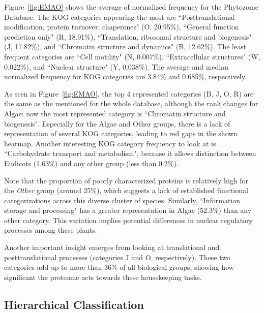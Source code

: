 Figure~\ref{fig:EMAO} shows the average of normalized frequency 
for the Phytozome Database. The KOG categories 
appearing the most are ``Posttranslational modification, 
protein turnover, chaperones" (O, 20.95\%), ``General function 
prediction only" (R, 18.91\%), ``Translation, ribosomal 
structure and biogenesis" (J, 17.82\%), and ``Chromatin 
structure and dynamics" (B, 12.62\%). The least frequent 
categories are ``Cell motility" (N, 0.007\%), ``Extracellular 
structures" (W, 0.022\%), and ``Nuclear structure" 
(Y, 0.038\%). The average and median normalized frequency 
for KOG categories are 3.84\% and 0.685\%, respectively. 

As seen in Figure~\ref{fig:EMAO}, the top 4 represented 
categories (B, J, O, R) are the same as the mentioned for the 
whole database, although the rank changes for Algae: now the 
most represented category is ``Chromatin structure and 
biogenesis". Especially for the Algae and Other groups, there 
is a lack of representation of several KOG categories, 
leading to red gaps in the shown heatmap.
Another interesting KOG category frequency to look at is 
``Carbohydrate transport and metabolism", because it 
allows distinction between Eudicots (1.63\%) and any other 
group (less than 0.2\%).

Note that the proportion of poorly characterized proteins 
is relatively high for the \emph{Other} group (around 25\%), 
which suggests a lack of established functional 
categorizations across this diverse cluster of species. 
Similarly, ``Information storage and processing" has a 
greater representation in Algae (52.3\%) than any other 
category. This variation implies potential differences 
in nuclear regulatory processes among these plants.

Another important insight emerges from looking at translational 
and posttranslational processes (categories J and O, 
respectively). These two categories add up to more than 
36\% of all biological groups, showing how significant the 
proteome acts towards these housekeeping tasks.


\subsection{Hierarchical Classification}
\label{sec:results.hierarchy}


